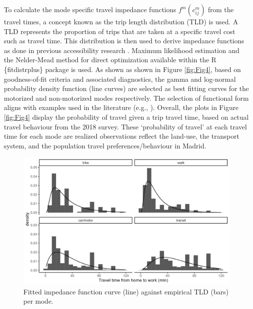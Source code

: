 \documentclass[numbered]{trbunofficial}
\begin{document}
To calculate the mode specific travel impedance functions
\(f^m(c_{ij}^m)\) from the travel times, a concept known as the trip
length distribution (TLD) is used. A TLD represents the proportion of
trips that are taken at a specific travel cost such as travel time. This
distribution is then used to derive impedance functions as done in
previous accessibility research \citep[e.g., works
of][\citet{horbachov_theoretical_2018}, and
\citet{batista_estimation_2019}]{lopez_2017_spatial}. Maximum likelihood
estimation and the Nelder-Mead method for direct optimization available
within the R \{fitdistrplus\} package \citep{fitdistrplus_2015} is used.
As shown as shown in Figure \ref{fig:Fig4}, based on goodness-of-fit
criteria and associated diagnostics, the gamma and log-normal
probability density function (line curves) are selected as best fitting
curves for the motorized and non-motorized modes respectively. The
selection of functional form aligns with examples used in the literature
(e.g., \citet{reggianiAccessibilityImpedanceForms2011}). Overall, the
plots in Figure \ref{fig:Fig4} display the probability of travel given a
trip travel time, based on actual travel behaviour from the 2018 survey.
These `probability of travel' at each travel time for each mode are
realized observations reflect the land-use, the transport system, and
the population travel preferences/behaviour in Madrid.

\begin{figure}

{\centering \includegraphics[width=1\linewidth]{images/tlds_curves_m_plot} 

}

\caption{\label{fig:Fig4} Fitted impedance function curve (line) against empirical TLD (bars) per mode.}\label{fig:tlds-curves-m-plot}
\end{figure}
\end{document}
